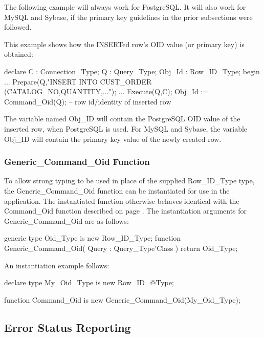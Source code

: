 \documentclass[english,letterpaper]{book}
\begin{document}
The following example will always work for PostgreSQL. It will also
work for MySQL and Sybase, if the primary key guidelines in the prior
subsections were followed. 

This example shows how the INSERTed row's OID value (or primary key)
is obtained:

\begin{Example}
declare
   C :      Connection_Type;
   Q :      Query_Type;
   Obj_Id : Row_ID_Type;
begin
   ...
   Prepare(Q,"INSERT INTO CUST_ORDER (CATALOG_NO,QUANTITY,...");
   ...
   Execute(Q,C);
   Obj_Id := Command_Oid(Q);  -- row id/identity of inserted row
\end{Example}

The variable named Obj\_ID will contain the PostgreSQL OID value of
the inserted row, when PostgreSQL is used. For MySQL and Sybase, the
variable Obj\_ID will contain the primary key value of the newly created
row.


\subsubsection{Generic\_Command\_Oid Function}

To allow strong typing to be used in place of the supplied Row\_ID\_Type
type, the Generic\_Command\_Oid function can be instantiated for use
in the application. The instantiated function otherwise behaves identical
with the Command\_Oid function described on page \pageref{Command_Oid Function}.
The instantiation arguments for Generic\_Command\_Oid are as follows:

\begin{Code}
generic
   type Oid_Type is new Row_ID_Type;
function Generic_Command_Oid(
   Query : Query_Type'Class
) return Oid_Type;
\end{Code}

An instantiation example follows:

\begin{Example}
declare
   type My_Oid_Type is new Row_ID_@Type;

   function Command_Oid 
      is new Generic_Command_Oid(My_Oid_Type);
\end{Example}

\subsection{Error Status Reporting\label{Error Status Reporting}}
\end{document}
